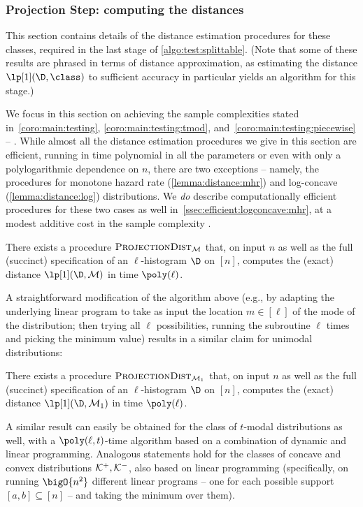 \subsubsection{Projection Step: computing the distances} 
This section contains details of the distance estimation procedures for these classes, required in the last stage of \cref{algo:test:splittable}. (Note that some of these results are phrased in terms of distance approximation, as estimating the distance $\lp[1](\D,\class)$ to sufficient accuracy in particular yields an algorithm for this stage.)

We focus in this section on achieving the sample complexities stated in~\cref{coro:main:testing}, \cref{coro:main:testing:tmod}, and~\cref{coro:main:testing:piecewise} -- . While almost all the distance estimation procedures we give in this section are efficient, running in time polynomial in all the parameters or even with only a polylogarithmic dependence on $n$, there are two exceptions -- namely, the procedures for monotone hazard rate (\cref{lemma:distance:mhr}) and log-concave (\cref{lemma:distance:log}) distributions. We \emph{do} describe computationally efficient procedures for these two cases as well in~\cref{ssec:efficient:logconcave:mhr}, at a modest additive cost in the sample complexity .

\begin{lemma}\label{lemma:distance:mon}
There exists a procedure $\estimdist[\classmon]$ that, on input $n$ as well as the full (succinct) specification of an $\ell$-histogram $\D$ on $[n]$, computes the (exact) distance $\lp[1](\D,\classmon)$ in time $\poly(\ell)$.
\end{lemma}

A straightforward modification of the algorithm above (e.g., by adapting the underlying linear program to take as input the location $m\in[\ell]$ of the mode of the distribution; then trying all $\ell$ possibilities, running the subroutine $\ell$ times and picking the minimum value) results in a similar claim for unimodal distributions:
\begin{lemma}[Unimodality]\label{lemma:distance:uni}
There exists a procedure $\estimdist[\classuni]$ that, on input $n$ as well as the full (succinct) specification of an $\ell$-histogram $\D$ on $[n]$, computes the (exact) distance $\lp[1](\D,\classuni)$ in time $\poly(\ell)$.
\end{lemma}
A similar result can easily be obtained for the class of $t$-modal distributions as well, with a $\poly(\ell,t)$-time algorithm based on a combination of dynamic and linear programming. 
 Analogous statements hold for the classes of concave and convex distributions $\classcvx, \classcve$, also based on linear programming (specifically, on running $\bigO{n^2}$ different linear programs -- one for each possible support $[a,b]\subseteq[n]$ -- and taking the minimum over them).


